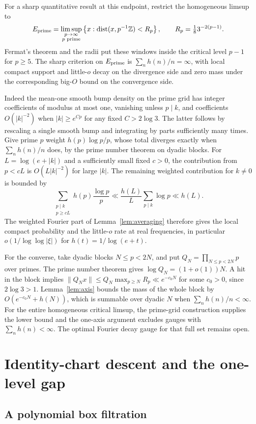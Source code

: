 \documentclass[11pt,a4paper,reqno]{amsart}
\theoremstyle{definition}
\theoremstyle{remark}
\numberwithin{equation}{section}
\begin{document}
For a sharp quantitative result at this endpoint, restrict the
homogeneous limsup to
\[
 E_{\rm prime}=\limsup_{\substack{p\to\infty\\p\text{ prime}}}
 \left\{x:\operatorname{dist}(x,p^{-1}\mathbb Z)<R_p\right\},
 \qquad R_p=\tfrac18 3^{-2(p-1)}.
\]
Fermat's theorem and the radii put these windows inside the critical
level $p-1$ for $p\ge5$. The sharp criterion on $E_{\rm prime}$ is
$\sum_n h(n)/n=\infty$, with local compact support and little-$o$
decay on the divergence side and zero mass under the corresponding
big-$O$ bound on the convergence side.

Indeed the mean-one smooth bump density on the prime grid has
integer coefficients of modulus at most one, vanishing unless
$p\mid k$, and coefficients $O(|k|^{-2})$ when $|k|\ge e^{Cp}$ for
any fixed $C>2\log 3$. The latter follows by rescaling a single
smooth bump and integrating by parts sufficiently many times. Give
prime $p$ weight $h(p)\log p/p$, whose total diverges exactly when
$\sum_n h(n)/n$ does, by the prime number theorem on dyadic blocks.
For $L=\log(e+|k|)$ and a sufficiently small fixed $c>0$, the
contribution from $p<cL$ is $O(L|k|^{-2})$ for large $|k|$. The
remaining weighted contribution for $k\ne0$ is bounded by
\[
 \sum_{\substack{p\mid k\\p\ge cL}} h(p)\frac{\log p}{p}
 \ll \frac{h(L)}{L}\sum_{p\mid k}\log p\ll h(L).
\]
The weighted Fourier part of Lemma~\ref{lem:averaging} therefore
gives the local compact probability and the little-$o$ rate at real
frequencies, in particular $o(1/\log\log|\xi|)$ for $h(t)=1/\log(e+t)$.

For the converse, take dyadic blocks $N\le p<2N$, and put
$Q_N=\prod_{N\le p<2N}p$ over primes. The prime number theorem gives
$\log Q_N=(1+o(1))N$. A hit in the block implies
$\|Q_Nx\|\le Q_N\max_{p\ge N}R_p\ll e^{-c_0N}$ for some $c_0>0$,
since $2\log 3>1$. Lemma~\ref{lem:axis} bounds the mass of the
whole block by $O(e^{-c_0N}+h(N))$, which is summable over dyadic
$N$ when $\sum_n h(n)/n<\infty$. For the entire homogeneous
critical limsup, the prime-grid construction supplies the lower
bound and the one-axis argument excludes gauges with $\sum_nh(n)<\infty$.
The optimal Fourier decay gauge for that full set remains open.
\appendix
\section{Identity-chart descent and the one-level gap}\label{sec:descent}

\subsection{A polynomial box filtration}
\end{document}

